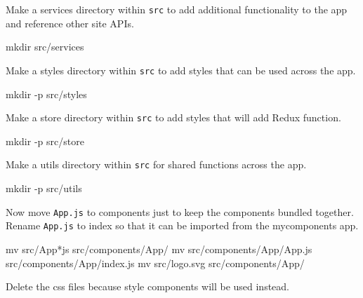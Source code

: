 \documentclass[]{book}
\newenvironment{Shaded}{\begin{snugshade}}{\end{snugshade}}
\newcommand{\FunctionTok}[1]{\textcolor[rgb]{0.00,0.00,0.00}{#1}}
\newcommand{\NormalTok}[1]{#1}
\begin{document}
Make a services directory within \texttt{src} to add additional functionality to the app and reference other site APIs.

\begin{Shaded}
\begin{Highlighting}[]
\FunctionTok{mkdir}\NormalTok{ src/services}
\end{Highlighting}
\end{Shaded}

Make a styles directory within \texttt{src} to add styles that can be used across the app.

\begin{Shaded}
\begin{Highlighting}[]
\FunctionTok{mkdir}\NormalTok{ -p src/styles}
\end{Highlighting}
\end{Shaded}

Make a store directory within \texttt{src} to add styles that will add Redux function.

\begin{Shaded}
\begin{Highlighting}[]
\FunctionTok{mkdir}\NormalTok{ -p src/store}
\end{Highlighting}
\end{Shaded}

Make a utils directory within \texttt{src} for shared functions across the app.

\begin{Shaded}
\begin{Highlighting}[]
\FunctionTok{mkdir}\NormalTok{ -p src/utils}
\end{Highlighting}
\end{Shaded}

Now move \texttt{App.js} to components just to keep the components bundled together.
Rename \texttt{App.js} to index so that it can be imported from the mycomponents app.

\begin{Shaded}
\begin{Highlighting}[]
\FunctionTok{mv}\NormalTok{ src/App*js src/components/App/}
\FunctionTok{mv}\NormalTok{ src/components/App/App.js src/components/App/index.js}
\FunctionTok{mv}\NormalTok{ src/logo.svg src/components/App/}
\end{Highlighting}
\end{Shaded}

Delete the css files because style components will be used instead.
\end{document}
